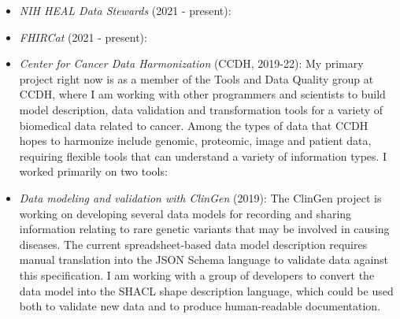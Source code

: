 \begin{itemize}
\begin{products}
\end{products}

\item \textit{NIH HEAL Data Stewards} (2021 - present): 

\item \textit{FHIRCat} (2021 - present): 

\item \textit{Center for Cancer Data Harmonization} (CCDH, 2019-22): My primary project right now is as a member of the Tools and Data Quality group at CCDH, where I am working with other programmers and scientists to build model description, data validation and transformation tools for a variety of biomedical data related to cancer. Among the types of data that CCDH hopes to harmonize include genomic, proteomic, image and patient data, requiring flexible tools that can understand a variety of information types. I worked primarily on two tools:

\begin{products}



\end{products}

\item \textit{Data modeling and validation with ClinGen} (2019): The ClinGen project is working on developing several data models for recording and sharing information relating to rare genetic variants that may be involved in causing diseases. The current spreadsheet-based data model description requires manual translation into the JSON Schema language to validate data against this specification. I am working with a group of developers to convert the data model into the SHACL shape description language, which could be used both to validate new data and to produce human-readable documentation.

\begin{products}


\end{products}


\end{itemize}
